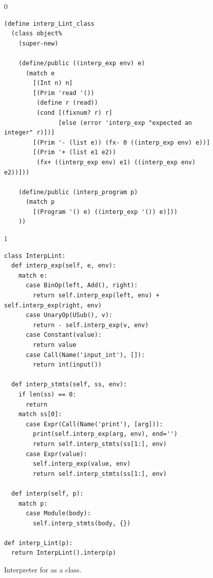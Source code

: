 \documentclass[7x10]{TimesAPriori_MIT}%
\def\racketEd{0}
\def\pythonEd{1}
\def\edition{1}
\begin{document}
\begin{figure}[tp]
{\if\edition\racketEd
\begin{lstlisting}
(define interp_Lint_class
  (class object%
    (super-new)
    
    (define/public ((interp_exp env) e)
      (match e
        [(Int n) n]
        [(Prim 'read '())
         (define r (read))
         (cond [(fixnum? r) r]
               [else (error 'interp_exp "expected an integer" r)])]
        [(Prim '- (list e)) (fx- 0 ((interp_exp env) e))]
        [(Prim '+ (list e1 e2))
         (fx+ ((interp_exp env) e1) ((interp_exp env) e2))]))

    (define/public (interp_program p)
      (match p
        [(Program '() e) ((interp_exp '()) e)]))
    ))
\end{lstlisting}
\fi}
{\if\edition\pythonEd
\begin{lstlisting}
class InterpLint:
  def interp_exp(self, e, env):
    match e:
      case BinOp(left, Add(), right):
        return self.interp_exp(left, env) + self.interp_exp(right, env)
      case UnaryOp(USub(), v):
        return - self.interp_exp(v, env)
      case Constant(value):
        return value
      case Call(Name('input_int'), []):
        return int(input())            

  def interp_stmts(self, ss, env):
    if len(ss) == 0:
      return
    match ss[0]:
      case Expr(Call(Name('print'), [arg])):
        print(self.interp_exp(arg, env), end='')
        return self.interp_stmts(ss[1:], env)
      case Expr(value):
        self.interp_exp(value, env)
        return self.interp_stmts(ss[1:], env)

  def interp(self, p):
    match p:
      case Module(body):
        self.interp_stmts(body, {})

def interp_Lint(p):
  return InterpLint().interp(p)
\end{lstlisting}
\fi}
\caption{Interpreter for \LangInt{} as a class.}
\label{fig:interp-Lint-class}
\end{figure}
\end{document}
